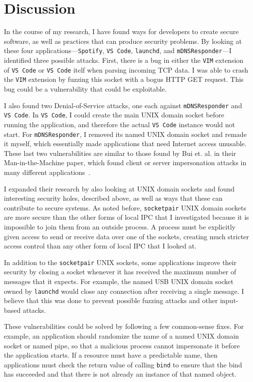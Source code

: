 \chapter{Discussion}
\label{sec:discussion}
In the course of my research, I have found ways for developers to create secure software, as well as practices that can produce security problems.  By looking at these four applications---\texttt{Spotify}, \texttt{VS Code}, \texttt{launchd}, and \texttt{mDNSResponder}---I identified three possible attacks.  First, there is a bug in either the \texttt{VIM} extension of \texttt{VS Code} or \texttt{VS Code} itelf when parsing incoming TCP data.  I was able to crash the \texttt{VIM} extension by fuzzing this socket with a bogus HTTP GET request.  This bug could be a vulnerability that could be exploitable.

I also found two Denial-of-Service attacks, one each against \texttt{mDNSResponder} and \texttt{VS Code}.  In \texttt{VS Code}, I could create the main UNIX domain socket before running the application, and therefore the actual \texttt{VS Code} instance would not start.  For \texttt{mDNSResponder}, I removed its named UNIX domain socket and remade it myself, which essentially made applications that need Internet access unusable.  These last two vulnerabilities are similar to those found by Bui et. al. in their Man-in-the-Machine paper, which found client or server impersonation attacks in many different applications~\cite{MitMa}.


I expanded their research by also looking at UNIX domain sockets and found interesting security holes, described above, as well as ways that these can contribute to secure systems.  As noted before, \texttt{socketpair} UNIX domain sockets are more secure than the other forms of local IPC that I investigated because it is impossible to join them from an outside process.  A process must be explicitly given access to send or receive data over one of the sockets, creating much stricter access control than any other form of local IPC that I looked at.

In addition to the \texttt{socketpair} UNIX sockets, some applications improve their security by closing a socket whenever it has received the maximum number of messages that it expects.  For example, the named USB UNIX domain socket owned by \texttt{launchd} would close any connection after receiving a single message.  I believe that this was done to prevent possible fuzzing attacks and other input-based attacks.

These vulnerabilities could be solved by following a few common-sense fixes.  For example, an application should randomize the name of a named UNIX domain socket or named pipe, so that a malicious process cannot impersonate it before the application starts.  If a resource must have a predictable name, then applications must check the return value of calling \texttt{bind} to ensure that the bind has succeeded and that there is not already an instance of that named object.

